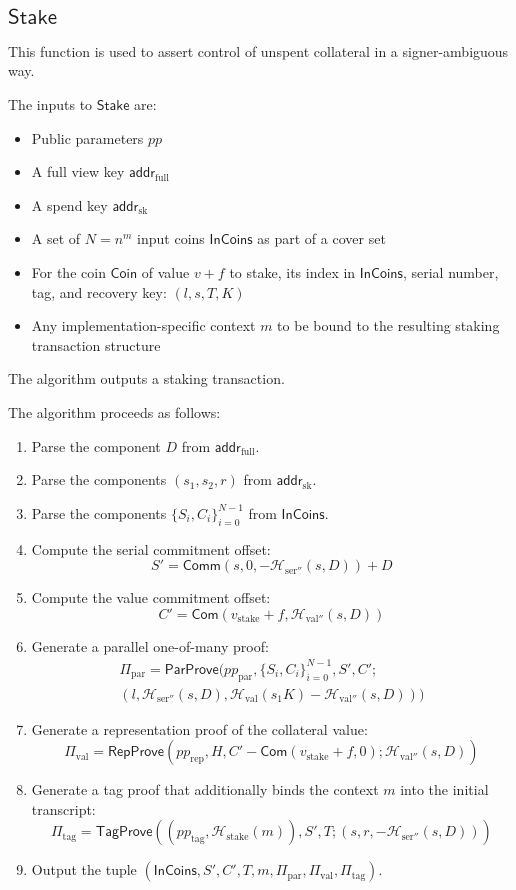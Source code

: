 \documentclass{article}
\newcommand{\func}[1]{\mathsf{#1}}
\newcommand{\com}{\func{Com}}
\newcommand{\comm}{\func{Comm}}
\newcommand{\addr}{\func{addr}}
\newcommand{\hash}{\mathcal{H}}
\theoremstyle{remark}
\begin{document}
\subsection{\texorpdfstring{$\func{Stake}$}{Stake}}

This function is used to assert control of unspent collateral in a signer-ambiguous way.

The inputs to $\func{Stake}$ are:
\begin{itemize}
    \item Public parameters $pp$
    \item A full view key $\addr_{\text{full}}$
    \item A spend key $\addr_{\text{sk}}$
    \item A set of $N = n^m$ input coins $\func{InCoins}$ as part of a cover set
    \item For the coin $\func{Coin}$ of value $v + f$ to stake, its index in $\func{InCoins}$, serial number, tag, and recovery key: $(l,s,T,K)$
    \item Any implementation-specific context $m$ to be bound to the resulting staking transaction structure
\end{itemize}
The algorithm outputs a staking transaction.

The algorithm proceeds as follows:
\begin{enumerate}
    \item Parse the component $D$ from $\addr_{\text{full}}$.
    \item Parse the components $(s_1,s_2,r)$ from $\addr_{\text{sk}}$.
    \item Parse the components $\{S_i,C_i\}_{i=0}^{N-1}$ from $\func{InCoins}$.
    \item Compute the serial commitment offset: $$S' = \comm(s,0,-\hash_{\text{ser}''}(s,D)) + D$$
    \item Compute the value commitment offset: $$C' = \com(v_{\text{stake}} + f,\hash_{\text{val}''}(s,D))$$
    \item Generate a parallel one-of-many proof:
    \begin{multline*}
        \Pi_{\text{par}} = \func{ParProve}(pp_{\text{par}},\{S_i,C_i\}_{i=0}^{N-1},S',C' ; \\
        (l,\hash_{\text{ser}''}(s,D),\hash_{\text{val}}(s_1 K) - \hash_{\text{val}''}(s,D)))
    \end{multline*}
    \item Generate a representation proof of the collateral value: $$\Pi_{\text{val}} = \func{RepProve}(pp_{\text{rep}},H,C'-\com(v_{\text{stake}} + f,0) ; \hash_{\text{val}''}(s,D))$$
    \item Generate a tag proof that additionally binds the context $m$ into the initial transcript: $$\Pi_{\text{tag}} = \func{TagProve}((pp_{\text{tag}},\hash_{\text{stake}}(m)),S',T ; (s,r,-\hash_{\text{ser}''}(s,D)))$$
    \item Output the tuple $(\func{InCoins},S',C',T,m,\Pi_{\text{par}},\Pi_{\text{val}},\Pi_{\text{tag}})$.
\end{enumerate}
\end{document}

